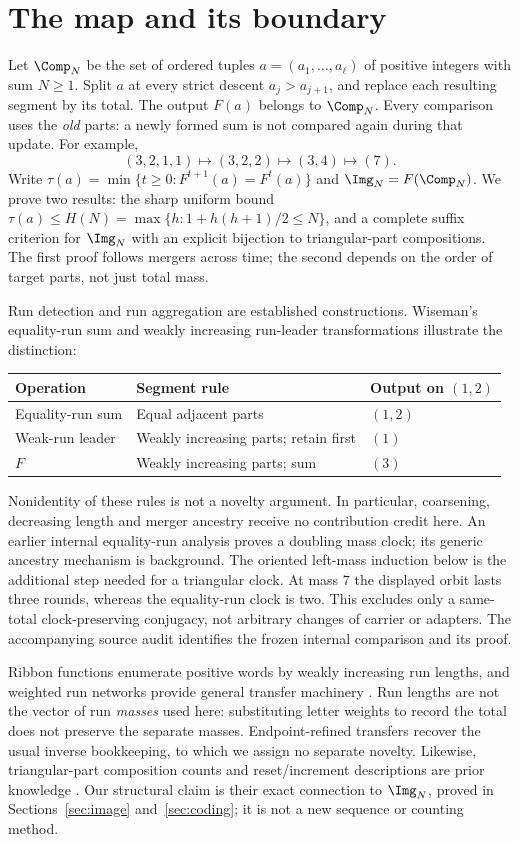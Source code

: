 \section{The map and its boundary}
Let $\Comp_N$ be the set of ordered tuples $a=(a_1,\ldots,a_\ell)$ of
positive integers with sum $N\ge1$. Split $a$ at every strict descent
$a_j>a_{j+1}$, and replace each resulting segment by its total. The output
$F(a)$ belongs to $\Comp_N$. Every comparison uses the \emph{old} parts:
a newly formed sum is not compared again during that update. For example,
\[
 (3,2,1,1)\longmapsto(3,2,2)\longmapsto(3,4)\longmapsto(7).
\]
Write $\tau(a)=\min\{t\ge0:F^{t+1}(a)=F^t(a)\}$ and
$\Img_N=F(\Comp_N)$. We prove two results: the sharp uniform bound
$\tau(a)\le H(N)=\max\{h:1+h(h+1)/2\le N\}$, and a complete suffix
criterion for $\Img_N$ with an explicit bijection to triangular-part
compositions. The first proof follows mergers across time; the second
depends on the order of target parts, not just total mass.

Run detection and run aggregation are established constructions. Wiseman's
equality-run sum and weakly increasing run-leader transformations
\citep{wiseman2022runs,wiseman2024leaders} illustrate the distinction:
\begin{center}
\begin{tabular}{@{}lll@{}}
\toprule
Operation & Segment rule & Output on $(1,2)$\\
\midrule
Equality-run sum & Equal adjacent parts & $(1,2)$\\
Weak-run leader & Weakly increasing parts; retain first & $(1)$\\
$F$ & Weakly increasing parts; sum & $(3)$\\
\bottomrule
\end{tabular}
\end{center}
Nonidentity of these rules is not a novelty argument. In particular,
coarsening, decreasing length and merger ancestry receive no contribution
credit here. An earlier internal equality-run analysis proves a doubling
mass clock; its generic ancestry mechanism is background. The oriented
left-mass induction below is the additional step needed for a triangular
clock. At mass $7$ the displayed orbit lasts three rounds, whereas the
equality-run clock is two. This excludes only a same-total clock-preserving
conjugacy, not arbitrary changes of carrier or adapters. The accompanying
source audit identifies the frozen internal comparison and its proof.

Ribbon functions enumerate positive words by weakly increasing run lengths,
and weighted run networks provide general transfer machinery
\citep{gessel2019reciprocals,zhuang2016runs,gesselzhuang2019homomorphisms}.
Run lengths are not the vector of run \emph{masses} used here: substituting
letter weights to record the total does not preserve the separate masses.
Endpoint-refined transfers recover the usual inverse bookkeeping, to which
we assign no separate novelty. Likewise, triangular-part composition
counts and reset/increment descriptions are prior knowledge
\citep{wilson1998triangular,robbins2014polygonal}. Our structural claim is
their exact connection to $\Img_N$, proved in Sections~\ref{sec:image}
and~\ref{sec:coding}; it is not a new sequence or counting method.
